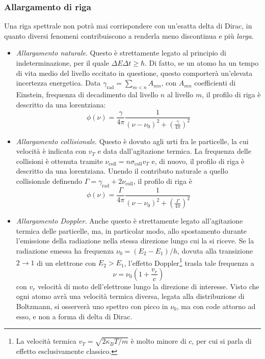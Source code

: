\documentclass[11pt, a4paper]{scrartcl}
\theoremstyle{style}
\theoremstyle{style1}
\numberwithin{equation}{subsection}
\begin{document}
\subsubsection{Allargamento di riga}
Una riga spettrale non potr\`a mai corrispondere con un'esatta delta di Dirac, in quanto diversi fenomeni contribuiscono a renderla meno discontinua e pi\`u \textit{larga}.
\begin{itemize}
	\item \textit{Allargamento naturale}.
		Questo \`e strettamente legato al principio di indeterminazione, per il quale $\Delta E \Delta t \ge  \hbar $. 
		Di fatto, se un atomo ha un tempo di vita medio del livello eccitato in questione, questo comporter\`a un'elevata incertezza energetica.
		Data $\gamma_\text{rad} = \sum_{m<n} A_{mn}$, con $A_{mn}$ coefficienti di Einstein, frequenza di decadimento dal livello $n$ al livello $m$, il profilo di riga \`e descritto da una lorentziana:
		\[
		\phi (\nu ) = \frac{\gamma}{4\pi} \frac{1}{(\nu -\nu _0)^2 + \left(\frac{\gamma}{4 \pi }\right)^2 }
		\] 
	\item \textit{Allargamento collisionale}.
		Questo \`e dovuto agli urti fra le particelle, la cui velocit\`a \`e indicata con $v_T$ e data dall'agitazione termica.
		La frequenza delle collisioni \`e ottenuta tramite $\nu _\text{coll} = n \sigma _\text{coll} v_T$ e, di nuovo, il profilo di riga \`e descritto da una lorentziana.
		Unendo il contributo naturale a quello collisionale definendo $\Gamma = \gamma_\text{rad} + 2 \nu _\text{coll}$, il profilo di riga \`e
		\[
		\phi (\nu ) = \frac{\Gamma}{4\pi} \frac{1}{(\nu -\nu _0)^2 + \left(\frac{\Gamma}{4\pi}\right) ^2}
		\] 
	\item \textit{Allargamento Doppler}.
		Anche questo \`e strettamente legato all'agitazione termica delle particelle, ma, in particolar modo, allo spostamento durante l'emissione della radiazione nella stessa direzione lungo cui la si riceve.
		Se la radiazione emessa ha frequenza $\nu _0 = (E_2 - E_1) / h$, dovuta alla transizione $2 \to  1$ di un elettrone con $E_2 > E_1$, l'effetto Doppler\footnote{La velocit\`a termica $v_T = \sqrt{2 \kappa _B T / m} $ \`e molto minore di $c$, per cui si parla di effetto esclusivamente classico.} trasla tale frequenza a 
		\[
		\nu  = \nu _0 \left(1 + \frac{v_r}{c}\right) 
		\] 
		con $v_r$ velocit\`a di moto dell'elettrone lungo la direzione di interesse.
		Visto che ogni atomo avr\`a una velocit\`a termica diversa, legata alla distribuzione di Boltzmann, si osserver\`a uno spettro con picco in $\nu _0$, ma con code attorno ad esso, e non a forma di delta di Dirac.


\end{itemize}
\end{document}
